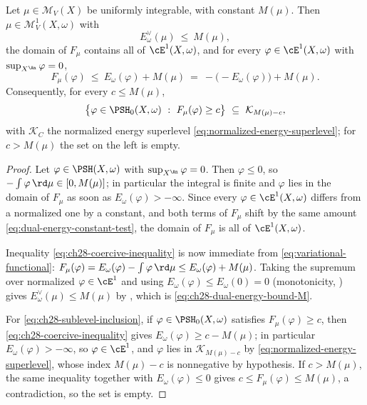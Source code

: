 \begin{lemma}
\label{lem:ch28-coercivity}
Let \(\mu\in\mathcal M_V(X)\) be uniformly integrable, with constant
\(M(\mu)\).  Then \(\mu\in\mathcal M^1_V(X,\omega)\) with
\begin{equation}
\label{eq:ch28-dual-energy-bound-M}
 E^\vee_\omega(\mu)\ \leq\ M(\mu),
\end{equation}
the domain of \(F_\mu\) contains all of \(\cE^1(X,\omega)\), and for every
\(\varphi\in\cE^1(X,\omega)\) with \(\sup_{X^{\An}}\varphi=0\),
\begin{equation}
\label{eq:ch28-coercive-inequality}
 F_\mu(\varphi)\ \leq\ E_\omega(\varphi)+M(\mu)
 \ =\ -\bigl(-E_\omega(\varphi)\bigr)+M(\mu).
\end{equation}
Consequently, for every \(c\leq M(\mu)\),
\begin{equation}
\label{eq:ch28-sublevel-inclusion}
 \bigl\{\varphi\in\PSH_0(X,\omega)\ :\ F_\mu(\varphi)\geq c\bigr\}
 \ \subseteq\ \mathcal K_{M(\mu)-c},
\end{equation}
with \(\mathcal K_C\) the normalized energy superlevel
\eqref{eq:normalized-energy-superlevel}; for \(c>M(\mu)\) the set on the
left is empty.
\end{lemma}

\begin{proof}
Let \(\varphi\in\PSH(X,\omega)\) with \(\sup_{X^{\An}}\varphi=0\).  Then
\(\varphi\leq0\), so \(-\int\varphi\,\rd\mu\in[0,M(\mu)]\); in particular
the integral is finite and \(\varphi\) lies in the domain of \(F_\mu\) as
soon as \(E_\omega(\varphi)>-\infty\).  Since every
\(\varphi\in\cE^1(X,\omega)\) differs from a normalized one by a constant,
and both terms of \(F_\mu\) shift by the same amount
\eqref{eq:dual-energy-constant-test}, the domain of \(F_\mu\) is all of
\(\cE^1(X,\omega)\).

Inequality \eqref{eq:ch28-coercive-inequality} is now immediate from
\eqref{eq:variational-functional}:
\(F_\mu(\varphi)=E_\omega(\varphi)-\int\varphi\,\rd\mu\leq
E_\omega(\varphi)+M(\mu)\).  Taking the supremum over normalized
\(\varphi\in\cE^1\) and using \(E_\omega(\varphi)\leq E_\omega(0)=0\)
(monotonicity, ) gives
\(E^\vee_\omega(\mu)\leq M(\mu)\) by
, which is
\eqref{eq:ch28-dual-energy-bound-M}.

For \eqref{eq:ch28-sublevel-inclusion}, if \(\varphi\in\PSH_0(X,\omega)\)
satisfies \(F_\mu(\varphi)\geq c\), then
\eqref{eq:ch28-coercive-inequality} gives
\(E_\omega(\varphi)\geq c-M(\mu)\); in particular
\(E_\omega(\varphi)>-\infty\), so \(\varphi\in\cE^1\), and \(\varphi\) lies
in \(\mathcal K_{M(\mu)-c}\) by \eqref{eq:normalized-energy-superlevel},
whose index \(M(\mu)-c\) is nonnegative by hypothesis.  If \(c>M(\mu)\), the
same inequality together with \(E_\omega(\varphi)\leq0\) gives
\(c\leq F_\mu(\varphi)\leq M(\mu)\), a contradiction, so the set is empty.
\end{proof}


